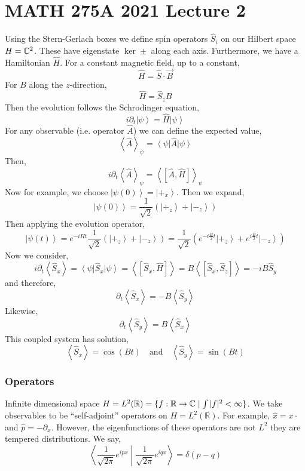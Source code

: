 \documentclass[12]{article}
\begin{document}
\section{MATH 275A 2021 Lecture 2}

\newcommand{\ket}[1]{\left| #1 \right>}
\newcommand{\bra}[1]{\left< #1 \right|}

Using the Stern-Gerlach boxes we define spin operators $\hat{S}_i$ on our Hilbert space $H = \mathbb{C}^2$. These have eigenstate $\ker{\pm}$ along each axis. Furthermore, we have a Hamiltonian $\hat{H}$. For a constant magnetic field, up to a constant,
\[ \hat{H} = \hat{S} \cdot \vec{B} \]
For $B$ along the $z$-direction,
\[ \hat{H} = \hat{S}_z B \]
Then the evolution follows the Schrodinger equation,
\[ i \partial_t \ket{\psi} = \hat{H} \ket{\psi} \]
For any observable (i.e. operator $\hat{A}$) we can define the expected value,
\[ \left< \hat{A} \right>_\psi = \bra{\psi} \hat{A} \ket{\psi} \]
Then,
\[ i \partial_t \left< \hat{A} \right>_\psi= \left< [\hat{A}, \hat{H}] \right>_{\psi} \]
Now for example, we choose $\ket{\psi(0)} = \ket{+_x}$. Then we expand,
\[ \ket{\psi(0)} = \frac{1}{\sqrt{2}} \left( \ket{+_z} + \ket{-_z} \right) \]
Then applying the evolution operator,
\[ \ket{\psi(t)} = e^{-i H t} \frac{1}{\sqrt{2}} \left( \ket{+_z} + \ket{-_z} \right) = \frac{1}{\sqrt{2}} \left( e^{-i \frac{B}{2}t} \ket{+_z} + e^{i \frac{B}{2}t} \ket{-_z} \right) \]
Now we consider,
\[ i \partial_t \left< \hat{S}_x \right> = \bra{\psi} \hat{S}_x \ket{\psi} = \left< [\hat{S}_x, \hat{H}] \right> = B \left< [\hat{S}_x, \hat{S}_z] \right> = - i B \hat{S}_y \]
and therefore,
\[ \partial_t \left< \hat{S}_x \right> = - B \left< \hat{S}_y \right> \]
Likewise,
\[ \partial_t \left< \hat{S}_y \right> = B \left< \hat{S}_x \right> \]
This coupled system has solution,
\[ \left< \hat{S}_x \right> = \cos{(B t)} \quad \text{and} \quad \left< \hat{S}_y \right> = \sin{(B t)} \]

\subsubsection{Operators}

\newcommand{\R}{\mathbb{R}}

Infinite dimensional space $H = L^2(\R) = \{ f : \R \to \C \mid \int |f|^2 < \infty \}$. We take observables to be ``self-adjoint'' operators on $H = L^2(\R)$. For example, $\hat{x} = x \cdot$ and $\hat{p} = - \partial_x$. However, the eigenfunctions of these operators are not $L^2$ they are tempered distributions. We say,
\[ \left< \frac{1}{\sqrt{2\pi}} e^{i p x} \middle| \frac{1}{\sqrt{2\pi}} e^{i q x} \right> = \delta(p - q) \]
\end{document}
